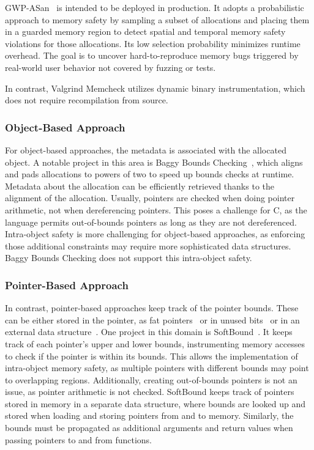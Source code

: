 GWP-ASan~\cite{serebryany2023gwp} is intended to be deployed in production.
It adopts a probabilistic approach to memory safety by sampling a subset of allocations and placing them in a guarded memory region to detect spatial and temporal memory safety violations for those allocations.
Its low selection probability minimizes runtime overhead.
The goal is to uncover hard-to-reproduce memory bugs triggered by real-world user behavior not covered by fuzzing or tests.

In contrast, Valgrind Memcheck utilizes dynamic binary instrumentation, which does not require recompilation from source.

\subsubsection{Object-Based Approach}

For object-based approaches, the metadata is associated with the allocated object.
A notable project in this area is Baggy Bounds Checking~\cite{akritidis2009baggy}, which aligns and pads allocations to powers of two to speed up bounds checks at runtime.
Metadata about the allocation can be efficiently retrieved thanks to the alignment of the allocation.
Usually, pointers are checked when doing pointer arithmetic, not when dereferencing pointers.
This poses a challenge for C, as the language permits out-of-bounds pointers as long as they are not dereferenced.
Intra-object safety is more challenging for object-based approaches, as enforcing those additional constraints may require more sophisticated data structures.
Baggy Bounds Checking does not support this intra-object safety.

\subsubsection{Pointer-Based Approach}

In contrast, pointer-based approaches keep track of the pointer bounds.
These can be either stored in the pointer, as fat pointers~\cite{watson_cheri_2020} or in unused bits~\cite{serebryany2018memory} or in an external data structure~\cite{nagarakatte2009softbound}.
One project in this domain is SoftBound~\cite{nagarakatte2009softbound}.
It keeps track of each pointer's upper and lower bounds, instrumenting memory accesses to check if the pointer is within its bounds.
This allows the implementation of intra-object memory safety, as multiple pointers with different bounds may point to overlapping regions.
Additionally, creating out-of-bounds pointers is not an issue, as pointer arithmetic is not checked.
SoftBound keeps track of pointers stored in memory in a separate data structure, where bounds are looked up and stored when loading and storing pointers from and to memory.
Similarly, the bounds must be propagated as additional arguments and return values when passing pointers to and from functions.

